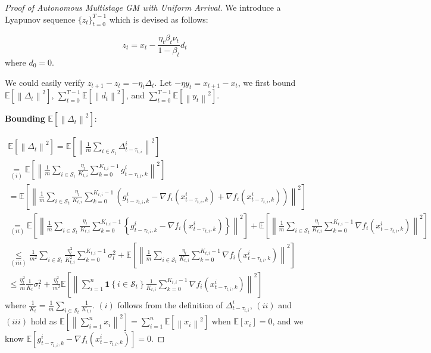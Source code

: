 \begin{proof}[Proof of Autonomous Multistage GM with Uniform Arrival]
We introduce a Lyapunov sequence $\{z_t\}_{t=0}^{T-1}$ which is devised as follows:

\begin{equation}
\label{auxiliary_seq}
z_t= x_t-\frac{\eta_t\beta_t\nu_t}{1-\beta_t}d_{t}
\end{equation}
where $d_0=0$.

We could easily verify $z_{t+1}-z_t= -\eta_t \Delta_t$. Let $-\eta y_t=x_{t+1}-x_t$, we first bound $\mathbb{E}\left[\left\| \Delta_t\right\|^2\right]$, $\sum_{t=0}^{T-1}\mathbb{E}\left[\left\| d_t\right\|^2\right]$, and $\sum_{t=0}^{T-1}\mathbb{E}\left[\left\| y_t\right\|^2\right]$.


\textbf{Bounding} $\mathbb{E}\left[\left\| \Delta_t\right\|^2\right]$:

\begin{equation}
\begin{gathered}
\mathbb{E}\left[\left\| \Delta_t\right\|^2\right] = \mathbb{E}\left[\left\| \frac{1}{m}\sum_{i\in\mathcal{S}_t}\Delta^i_{t-\tau_{t,i}} \right\|^2\right]\\
\underset{(i)}{=}\mathbb{E}\left[\left\| \frac{1}{m}\sum_{i\in\mathcal{S}_t}  \frac{\eta_l}{K_{t,i}} \sum_{k=0}^{K_{t,i}-1} g_{t-\tau_{t,i},k}^i \right\|^2\right] \\
= \mathbb{E}\left[\left\| \frac{1}{m}\sum_{i\in\mathcal{S}_t} \frac{\eta_l}{K_{t,i}} \sum_{k=0}^{K_{t,i}-1} \left( g_{t-\tau_{t,i},k}^i - \nabla f_i(x_{t-\tau_{t,i},k}^i) + \nabla f_i(x_{t-\tau_{t,i},k}^i)\right) \right\|^2\right] \\
\underset{(ii)}{=} \mathbb{E}\left[\left\| \frac{1}{m}\sum_{i\in\mathcal{S}_t} \frac{\eta_l}{K_{t,i}} \sum_{k=0}^{K_{t,i}-1} \left\{ g_{t-\tau_{t,i},k}^i - \nabla f_i(x_{t-\tau_{t,i},k}^i) \right\}  \right\|^2\right] + \mathbb{E}\left[\left\| \frac{1}{m}\sum_{i\in\mathcal{S}_t} \frac{\eta_l}{K_{t,i}} \sum_{k=0}^{K_{t,i}-1}  \nabla f_i(x_{t-\tau_{t,i},k}^i) \right\|^2\right]\\
\underset{(iii)}{\leq} \frac{1}{m^2}\sum_{i\in\mathcal{S}_t}\frac{\eta_l^2}{K^2_{t,i}}\sum_{k=0}^{K_{t,i}-1}\sigma_l^2 + \mathbb{E}\left[\left\| \frac{1}{m}\sum_{i\in\mathcal{S}_t} \frac{\eta_l}{K_{t,i}} \sum_{k=0}^{K_{t,i}-1}  \nabla f_i(x_{t-\tau_{t,i},k}^i) \right\|^2\right]\\
\leq \frac{\eta_l^2}{m}\frac{1}{K_t}\sigma^2_l + \frac{\eta_l^2}{m^2}  \mathbb{E}\left[\left\| \sum_{i=1}^n\mathbf{1}\left\{i\in\mathcal{S}_t\right\} \frac{1}{K_{t,i}} \sum_{k=0}^{K_{t,i}-1}  \nabla f_i(x_{t-\tau_{t,i},k}^i) \right\|^2\right]
\end{gathered}\nonumber
\end{equation}
where $\frac{1}{K_t}=\frac{1}{m}\sum_{i\in\mathcal{S}_t}\frac{1}{K_{t,i}}$. $(i)$ follows from the definition of $\Delta^i_{t-\tau_{t,i}}$, $(ii)$ and $(iii)$ hold as $\mathbb{E}\left[\left\|\sum_{i=1}^n x_i\right\|^2\right] = \sum_{i=1}^n \mathbb{E}\left[\left\| x_i \right\|^2\right]$ when $\mathbb{E}\left[ x_i \right]=0$, and we know $\mathbb{E}\left[g_{t-\tau_{t,i},k}^i - \nabla f_i(x_{t-\tau_{t,i},k}^i)\right]=0$.



\end{proof}
